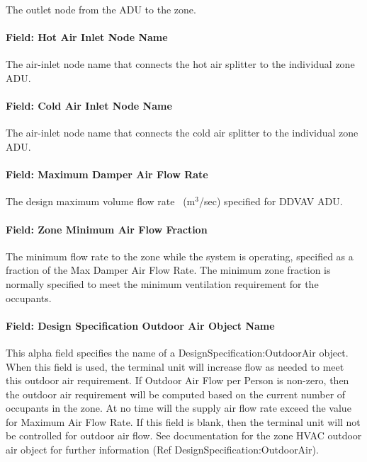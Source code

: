 The outlet node from the ADU to the zone.

\paragraph{Field: Hot Air Inlet Node Name}\label{field-hot-air-inlet-node-name-1}

The air-inlet node name that connects the hot air splitter to the individual zone ADU.

\paragraph{Field: Cold Air Inlet Node Name}\label{field-cold-air-inlet-node-name-1}

The air-inlet node name that connects the cold air splitter to the individual zone ADU.

\paragraph{Field: Maximum Damper Air Flow Rate}\label{field-maximum-damper-air-flow-rate}

The design maximum volume flow rate~ (m\(^{3}\)/sec) specified for DDVAV ADU.

\paragraph{Field: Zone Minimum Air Flow Fraction}\label{field-zone-minimum-air-flow-fraction-3}

The minimum flow rate to the zone while the system is operating, specified as a fraction of the Max Damper Air Flow Rate. The minimum zone fraction is normally specified to meet the minimum ventilation requirement for the occupants.

\paragraph{Field: Design Specification Outdoor Air Object Name}\label{field-design-specification-outdoor-air-object-name-2}

This alpha field specifies the name of a DesignSpecification:OutdoorAir object. When this field is used, the terminal unit will increase flow as needed to meet this outdoor air requirement. If Outdoor Air Flow per Person is non-zero, then the outdoor air requirement will be computed based on the current number of occupants in the zone. At no time will the supply air flow rate exceed the value for Maximum Air Flow Rate. If this field is blank, then the terminal unit will not be controlled for outdoor air flow. See documentation for the zone HVAC outdoor air object for further information (Ref DesignSpecification:OutdoorAir).

